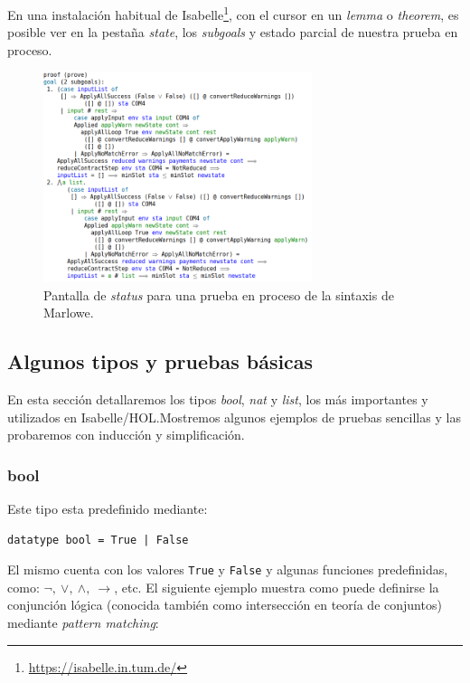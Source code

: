 \documentclass[12pt]{book}
\begin{document}
En una instalación habitual de Isabelle\footnote{\url{https://isabelle.in.tum.de/}}, con el cursor en un \textit{lemma} o \textit{theorem}, es posible ver en la pestaña \textit{state}, los \textit{subgoals} y estado parcial de nuestra prueba en proceso.

\begin{figure}[H]
	\centering
    \includegraphics[width=0.7\textwidth]{Proof_state_isabelle.png}
	\caption{Pantalla de \textit{status} para una prueba en proceso de la sintaxis de Marlowe.}\label{fig:Proof_state}
\end{figure}


\subsection{Algunos tipos y pruebas básicas}

En esta sección detallaremos los tipos \textit{bool}, \textit{nat} y \textit{list}, los más importantes y utilizados en Isabelle/HOL.\@ Mostremos algunos ejemplos de pruebas sencillas y las probaremos con inducción y simplificación.

\subsubsection{bool}

Este tipo esta predefinido mediante:

\begin{lstlisting}[style=Isabelle]
datatype bool = True | False
\end{lstlisting}

El mismo cuenta con los valores \texttt{True} y \texttt{False} y algunas funciones predefinidas,\\ como:  $\neg,\ \vee,\ \wedge,\ \rightarrow$, etc. El siguiente ejemplo muestra como puede definirse la conjunción lógica (conocida también como intersección en teoría de conjuntos) mediante \textit{pattern matching}:
\end{document}
